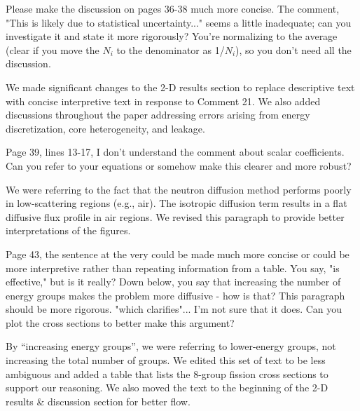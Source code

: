 \documentclass[answers,11pt]{exam}
\begin{document}
\begin{questions}
    \question Please make the discussion on pages 36-38 much more concise. The comment, "This is likely due to statistical uncertainty..." seems a little inadequate; can you investigate it and state it more rigorously? You're normalizing to the average (clear if you move the $N_i$ to the denominator as 1/$N_i$), so you don't need all the discussion.
    \begin{solution}
        We made significant changes to the 2-D results section to replace descriptive text with
        concise interpretive text in response to Comment 21.
        We also added discussions throughout the paper addressing errors arising from energy
        discretization, core heterogeneity, and leakage.
    \end{solution}

    \question Page 39, lines 13-17, I don't understand the comment about scalar coefficients. Can you refer to your equations or somehow make this clearer and more robust?
    \begin{solution}
        We were referring to the fact that the neutron diffusion method performs poorly in
        low-scattering regions (e.g., air). The isotropic diffusion term results in a flat
        diffusive flux profile in air regions.
        We revised this paragraph to provide better interpretations of the figures.
    \end{solution}

    \question Page 43, the sentence at the very could be made much more concise or could be more interpretive rather than repeating information from a table. You say, "is effective," but is it really? Down below, you say that increasing the number of energy groups makes the problem more diffusive - how is that? This paragraph should be more rigorous. "which clarifies"... I'm not sure that it does. Can you plot the cross sections to better make this argument?
    \begin{solution}
        By ``increasing energy groups'', we were referring to lower-energy groups, not increasing
        the total number of groups. We edited this set of text to be less ambiguous and added a table
        that lists the 8-group fission cross sections to support our reasoning. We also moved the
        text to the beginning of the 2-D results \& discussion section for better flow.
    \end{solution}

\end{questions}

\end{document}
